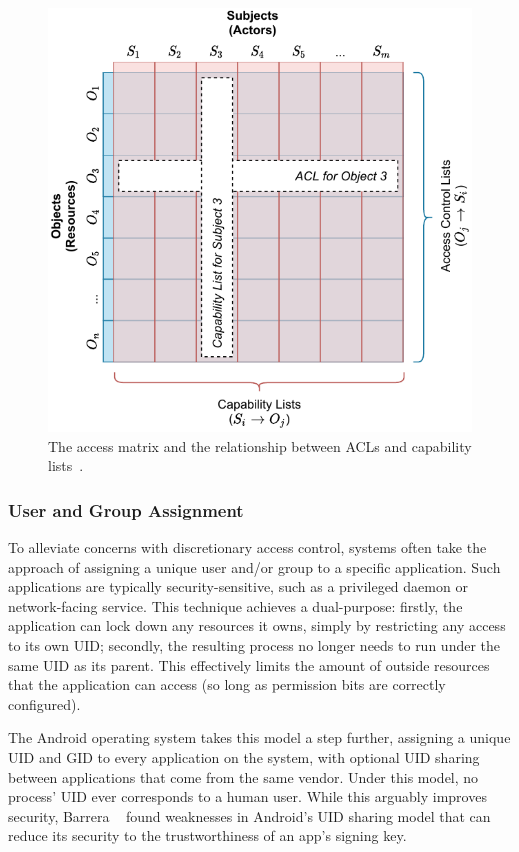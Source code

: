 \begin{figure}[tbp]
  \centering
  \includegraphics[width=0.8\linewidth]{figs/background/acl.pdf}
  \caption[The access matrix]{
    The access matrix and the relationship between ACLs and capability
    lists~\cite{van_oorschot2020_tools_jewels, jaeger2008_os_security}.
  }%
  \label{fig:acl}
\end{figure}

\subsubsection*{User and Group Assignment}

To alleviate concerns with discretionary access control, systems often take the approach of
assigning a unique user and/or group to a specific application. Such applications are
typically security-sensitive, such as a privileged daemon or network-facing service. This
technique achieves a dual-purpose: firstly, the application can lock down any resources it
owns, simply by restricting any access to its own UID; secondly, the resulting process no
longer needs to run under the same UID as its parent. This effectively limits the amount
of outside resources that the application can access (so long as permission bits are
correctly configured).

The Android operating system takes this model a step further, assigning a unique UID and
GID to every application on the system, with optional UID sharing between applications
that come from the same vendor. Under this model, no process' UID ever corresponds to
a human user. While this arguably improves security, Barrera
\etal~\cite{barrera2012_android} found weaknesses in Android's UID sharing model that can
reduce its security to the trustworthiness of an app's signing key.

